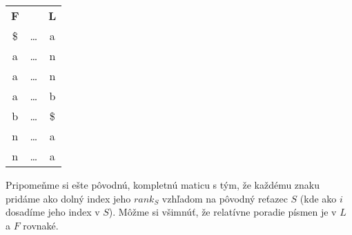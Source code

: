     \begin{example}
        \begin{tabular}{ c c c }
            \textbf{F}   &        & \textbf{L} \\  
            \$           & \ldots & a          \\
            a            & \ldots & n          \\
            a            & \ldots & n          \\
            a            & \ldots & b          \\
            b            & \ldots & \$         \\
            n            & \ldots & a          \\
            n            & \ldots & a          \\
        \end{tabular}
    \end{example}
    
    \bigskip    
    
    Pripomeňme si ešte pôvodnú, kompletnú maticu s tým, že každému znaku
    pridáme ako dolný index jeho $rank_S$ vzhľadom na pôvodný reťazec $S$ (kde
    ako $i$ dosadíme jeho index v $S$). Môžme si všimnúť, že relatívne
    poradie písmen je v $L$ a $F$ rovnaké.
    
